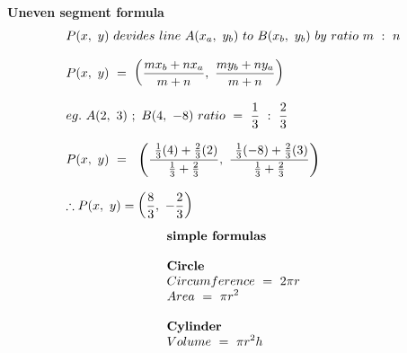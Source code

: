 \documentclass{article}
\begin{document}
\begin{multicols}{2}
    \textbf{Uneven segment formula}
    \[
    \begin{array}{>{\displaystyle}l}
        P( x,\ y) \ devides\ line\ A( x_{a} ,\ y_{b}) \ to\ B( x_{b} ,\ y_{b}) \ by\ ratio\ m\ :\ n\\
        \\
        P( x,\ y) \ =\ \left(\frac{mx_{b} +nx_{a}}{m+n} ,\ \frac{my_{b} +ny_{a}}{m+n}\right)\\
        \\
        eg.\ A( 2,\ 3) \ ;\ B( 4,\ -8) \ ratio\ =\ \frac{1}{3} \ :\ \frac{2}{3}\\
        \\
        P( x,\ y) \ =\ \ \left(\frac{\ \frac{1}{3}( 4) +\frac{2}{3}( 2)}{\frac{1}{3} +\frac{2}{3}} ,\ \frac{\ \frac{1}{3}( -8) +\frac{2}{3}( 3)}{\frac{1}{3} +\frac{2}{3}}\right)\\
        \\ 
        \therefore P( x,\ y) =\left(\frac{8}{3} ,\ -\frac{2}{3}\right)
    \end{array}
    \]
    \columnbreak
    \noindent 
    \[
    \begin{array}{>{\displaystyle}l}
        \textbf{simple formulas}\\
        \\
        \mathbf{Circle}\\
        Circumference\ =\ 2\pi r\\
        Area\ =\ \pi r^{2}\\
        \\
        \mathbf{Cylinder}\\
        Volume\ =\ \pi r^{2} h
    \end{array}
    \]
\end{multicols}
\end{document}
